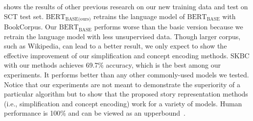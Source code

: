  shows the results of other previous research on our new training data and 
test on SCT test set.
$\text{BERT}_\text{BASE(ours)}$ retrains the 
language model of  $\text{BERT}_\text{BASE}$  with BookCorpus.
Our $\text{BERT}_\text{BASE}$ performs worse than the basic version because we retrain the 
language model with less unsupervised data. Though larger corpus, such as Wikipedia, can lead to a better result,
we only expect to show the effective improvement of our simplification and concept encoding methods. 
SKBC with our methods achieves 69.7\% accuracy, which is the best among our experiments. 
It performs better than any other commonly-used models we tested. 
Notice that our experiments are not meant to demonstrate the superiority of a
particular algorithm but to show that the proposed story representation 
methods (i.e., simplification and concept encoding) work for
a variety of models. 
Human performance is 100\% and can be viewed as an 
upperbound~\cite{mostafazadeh2016corpus}. 
